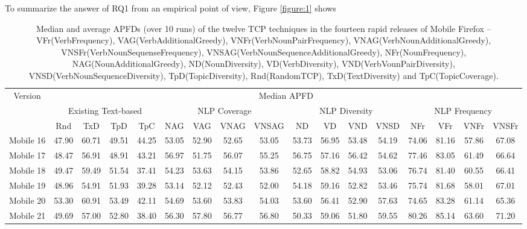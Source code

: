 \documentclass[conference]{IEEEtran}
\begin{document}
To summarize the answer of RQ1 from an empirical point of view, Figure \ref{figure:1} shows 



\begin{table*}[t!]
\centering
\caption{Median and average APFDs (over 10 runs) of the twelve TCP techniques in the fourteen rapid releases of Mobile Firefox --VFr(VerbFrequency), VAG(VerbAdditionalGreedy), VNFr(VerbNounPairFrequency), VNAG(VerbNounAdditionalGreedy), VNSFr(VerbNounSequenseFrequency), VNSAG(VerbNounSequenceAdditionalGreedy), NFr(NounFrequency), NAG(NounAdditionalGreedy), ND(NounDiversity), VD(VerbDiversity), VND(VerbVounPairDiversity), VNSD(VerbNounSequenceDiversity),
TpD(TopicDiversity), Rnd(RandomTCP), TxD(TextDiversity) and TpC(TopicCoverage).}
\label{table:2}
\begin{tabular}{ |c|c c c c|c c c c|c c c c|c c c c|}
\hline
\multirow{3}{*}{Version} &
\multicolumn{16}{|c|}{Median APFD} \\
\cline{2-17}
\multicolumn{1}{|c}{} & 
\multicolumn{4}{|c}{Existing Text-based} & \multicolumn{4}{|c}{NLP Coverage}& \multicolumn{4}{|c}{NLP Diversity} &
\multicolumn{4}{|c|}{NLP Frequency}\\
\cline{2-17}
&    Rnd                 & TxD   & TpD   & TpC   & NAG          & VAG   & VNAG  & VNSAG & ND            & VD    & VND   & VNSD  & NFr           & VFr   & VNFr  & VNSFr \\
\hline
Mobile 16 & 47.90               & 60.71 & 49.51 & 44.25 & 53.05        & 52.90 & 52.65 & 53.05 & 53.73         & 56.95 & 53.48 & 54.19 & 74.06         & 81.16 & 57.86 & 67.08 \\
Mobile 17 & 48.47               & 56.91 & 48.91 & 43.21 & 56.97        & 51.75 & 56.07 & 55.25 & 56.75         & 57.16 & 56.42 & 54.62 & 77.46         & 83.05 & 61.49 & 66.64 \\
Mobile 18 & 49.47               & 59.49 & 51.54 & 37.41 & 54.23        & 53.63 & 54.15 & 53.86 & 52.65         & 58.82 & 54.93 & 53.06 & 76.74         & 81.40 & 60.55 & 66.41 \\
Mobile 19 & 48.96               & 54.91 & 51.93 & 39.28 & 53.14        & 52.12 & 52.43 & 52.00 & 54.18         & 59.16 & 52.82 & 53.46 & 75.74         & 81.68 & 58.01 & 67.01 \\
Mobile 20 & 53.30               & 60.91 & 53.49 & 42.11 & 54.69        & 53.60 & 53.83 & 54.03 & 53.60         & 56.41 & 52.90 & 57.63 & 74.65         & 83.28 & 61.14 & 65.36 \\
Mobile 21 & 49.69               & 57.00 & 52.80 & 38.40 & 56.30        & 57.80 & 56.77 & 56.80 & 50.33         & 59.06 & 51.80 & 59.55 & 80.26         & 85.14 & 63.60 & 71.20 \\

\end{tabular}
\end{table*}
\end{document}

